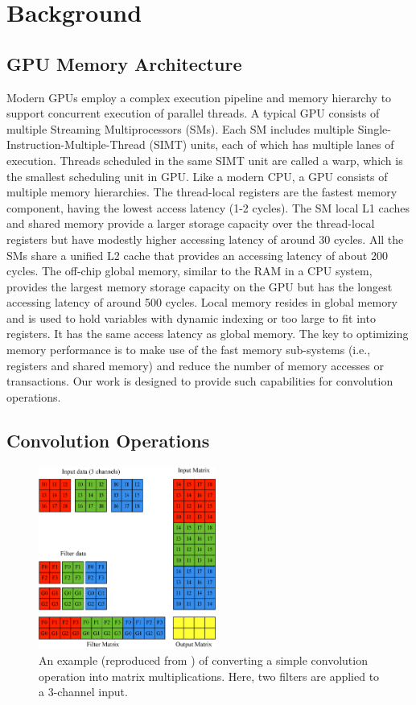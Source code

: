 
\section{Background}
\subsection{GPU Memory Architecture}
Modern GPUs employ a complex execution pipeline and memory hierarchy to support concurrent execution of parallel threads. A typical GPU
consists of multiple Streaming Multiprocessors (SMs). Each SM includes multiple Single-Instruction-Multiple-Thread (SIMT) units, each of
which has multiple lanes of execution. Threads scheduled in the same SIMT unit are called a warp, which is the smallest scheduling unit in
GPU. Like a modern CPU, a GPU consists of multiple memory hierarchies. The thread-local registers are the fastest memory component, having
the lowest access latency (1-2 cycles). The SM local L1 caches and shared memory provide a larger storage capacity over the thread-local
registers but have modestly higher accessing latency of around 30 cycles. All the SMs share a unified L2 cache that provides an accessing
latency of about 200 cycles. The off-chip global memory, similar to the RAM in a CPU system, provides the largest memory storage capacity
on the GPU but has the longest accessing latency of around 500 cycles. Local memory resides in global memory and is used to hold variables with dynamic indexing or too large to fit into registers. It has the same access latency as global memory. The key to optimizing memory performance is to make use of the fast
memory sub-systems (i.e., registers and shared memory) and reduce the number of memory accesses or transactions. Our work is designed to
provide such capabilities for convolution operations.

\subsection{Convolution Operations}
\begin{figure}[t!]
\centering
  \includegraphics[width=0.75\columnwidth,height=6cm]{./figure/convlowering.eps}
  \caption{An example (reproduced from \cite{ChetlurWVCTCS14}) of converting a simple convolution operation into matrix multiplications. Here, two filters are applied to a 3-channel input.}
  \label{fig:convlowering}
\end{figure}

